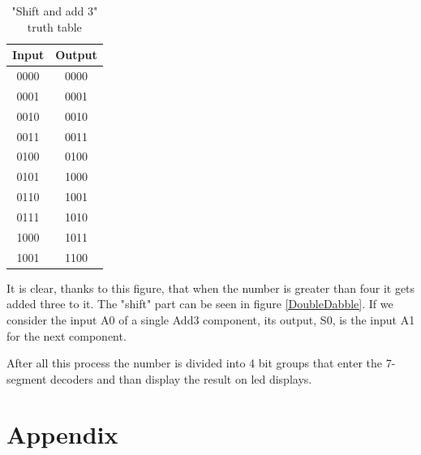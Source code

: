 \documentclass{article}
\begin{document}
\begin{table}[h]
  \centering
  \begin{tabular}{||c|c||}
    \hline
    Input & Output \\
    \hline
    0000 & 0000 \\
    0001 & 0001 \\
    0010 & 0010 \\ 
    0011 & 0011 \\
    0100 & 0100 \\
    0101 & 1000 \\
    0110 & 1001 \\
    0111 & 1010 \\
    1000 & 1011 \\
    1001 & 1100 \\
    \hline
  \end{tabular}
    \label{Add3Table}
    \caption{"Shift and add 3" truth table}
  \end{table}

It is clear, thanks to this figure, that when the number is greater than four it gets added three to it. The "shift" part can be seen in figure \ref{DoubleDabble}. If we consider the input A0 of a single Add3 component, its output, S0, is the input A1 for the next component.

After all this process the number is divided into 4 bit groups that enter the 7-segment decoders and than display the result on led displays.






\clearpage
\section{Appendix}
\end{document}
